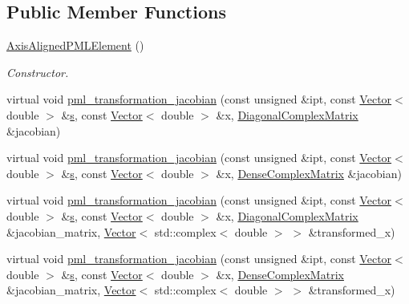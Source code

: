 \subsection*{Public Member Functions}
\begin{DoxyCompactItemize}
\item 
\hyperlink{classoomph_1_1AxisAlignedPMLElement_acb3d0ce377bf928f0fa83deedef775f0}{Axis\+Aligned\+P\+M\+L\+Element} ()
\begin{DoxyCompactList}\small\item\em Constructor. \end{DoxyCompactList}\item 
virtual void \hyperlink{classoomph_1_1AxisAlignedPMLElement_af93221809a1b5deaabe7cd818e30d9c9}{pml\+\_\+transformation\+\_\+jacobian} (const unsigned \&ipt, const \hyperlink{classoomph_1_1Vector}{Vector}$<$ double $>$ \&\hyperlink{cfortran_8h_ab7123126e4885ef647dd9c6e3807a21c}{s}, const \hyperlink{classoomph_1_1Vector}{Vector}$<$ double $>$ \&x, \hyperlink{classoomph_1_1DiagonalComplexMatrix}{Diagonal\+Complex\+Matrix} \&jacobian)
\item 
virtual void \hyperlink{classoomph_1_1AxisAlignedPMLElement_a9fba3c6d10af49f64833ecfe97b730c5}{pml\+\_\+transformation\+\_\+jacobian} (const unsigned \&ipt, const \hyperlink{classoomph_1_1Vector}{Vector}$<$ double $>$ \&\hyperlink{cfortran_8h_ab7123126e4885ef647dd9c6e3807a21c}{s}, const \hyperlink{classoomph_1_1Vector}{Vector}$<$ double $>$ \&x, \hyperlink{classoomph_1_1DenseComplexMatrix}{Dense\+Complex\+Matrix} \&jacobian)
\item 
virtual void \hyperlink{classoomph_1_1AxisAlignedPMLElement_a6407fbc195aab8b5a3c3746df1f4aa63}{pml\+\_\+transformation\+\_\+jacobian} (const unsigned \&ipt, const \hyperlink{classoomph_1_1Vector}{Vector}$<$ double $>$ \&\hyperlink{cfortran_8h_ab7123126e4885ef647dd9c6e3807a21c}{s}, const \hyperlink{classoomph_1_1Vector}{Vector}$<$ double $>$ \&x, \hyperlink{classoomph_1_1DiagonalComplexMatrix}{Diagonal\+Complex\+Matrix} \&jacobian\+\_\+matrix, \hyperlink{classoomph_1_1Vector}{Vector}$<$ std\+::complex$<$ double $>$ $>$ \&transformed\+\_\+x)
\item 
virtual void \hyperlink{classoomph_1_1AxisAlignedPMLElement_a808e638b642342a84da6749cdcdf78e4}{pml\+\_\+transformation\+\_\+jacobian} (const unsigned \&ipt, const \hyperlink{classoomph_1_1Vector}{Vector}$<$ double $>$ \&\hyperlink{cfortran_8h_ab7123126e4885ef647dd9c6e3807a21c}{s}, const \hyperlink{classoomph_1_1Vector}{Vector}$<$ double $>$ \&x, \hyperlink{classoomph_1_1DenseComplexMatrix}{Dense\+Complex\+Matrix} \&jacobian\+\_\+matrix, \hyperlink{classoomph_1_1Vector}{Vector}$<$ std\+::complex$<$ double $>$ $>$ \&transformed\+\_\+x)

\end{DoxyCompactItemize}
